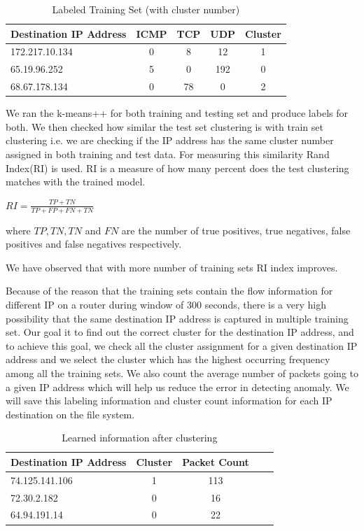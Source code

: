 \documentclass[12pt,oneside,a4paper]{article}
\begin{document}
\begin{table}[H]
\centering
  \begin{tabular}{| l | c | c | c | c |}
    \hline
    {Destination IP Address}  &ICMP  &TCP &UDP  &Cluster \\
    \hline
    172.217.10.134  & 0     & 8     & 12  &1  \\ \hline
    65.19.96.252    & 5     & 0     & 192 &0  \\ \hline
    68.67.178.134   & 0     & 78    & 0   &2  \\ \hline
  \end{tabular}
\caption{Labeled Training Set (with cluster number)} \label{table:labeled-set}
\end{table}


We ran the k-means++ for both training and testing set and produce labels for both. We then checked how similar the test set clustering is with train set clustering i.e. we are checking if the IP address has the same cluster number assigned in both training and test data. For measuring this similarity Rand Index(RI)\cite{ri-index} is used. RI is a measure of how many percent does the test clustering matches with the trained model.

\hspace{4cm} $RI={\frac {TP+TN}{TP+FP+FN+TN}}$

where $TP, TN, TN$ and $FN$ are the number of true positives, true negatives, false positives and false negatives respectively.

We have observed that with more number of training sets RI index improves.

Because of the reason that the training sets contain the flow information for different IP on a router during window of 300 seconds, there is a very high possibility that the same destination IP address is captured in multiple training set. Our goal it to find out the correct cluster for the destination IP address, and to achieve this goal, we check all the cluster assignment for a given destination IP address and we select the cluster which has the highest occurring frequency among all the training sets. We also count the average number of packets going to a given IP address which will help us reduce the error in detecting anomaly. We will save this labeling information and cluster count information for each IP destination on the file system.

\begin{table}[H]
\centering
  \begin{tabular}{| l | c | c | c | c |}
    \hline
    {Destination IP Address}  &Cluster  &Packet Count \\
    \hline
    74.125.141.106  & 1     & 113  \\ \hline
    72.30.2.182     & 0     & 16   \\ \hline
    64.94.191.14    & 0     & 22   \\ \hline
  \end{tabular}
\caption{Learned information after clustering} \label{table:learned-clustering}
\end{table}
\end{document}
